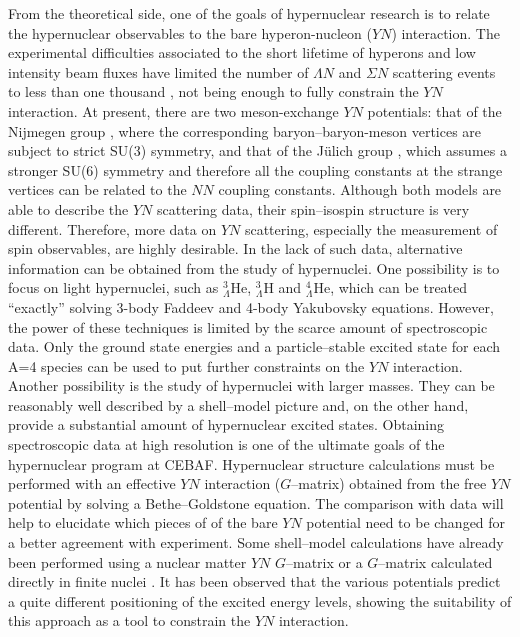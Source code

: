  From the theoretical side, one of the goals of hypernuclear research
is to relate the hypernuclear observables to the bare hyperon-nucleon
($YN$) interaction. The experimental
difficulties associated to the short lifetime of 
hyperons and low intensity beam fluxes have limited
the number of $\Lambda N$ and $\Sigma N$ scattering
events to less than one thousand \cite{scat1,scat2,scat3,scat4,scat5},
not being enough to fully constrain the $YN$ interaction. At
present, there are two meson-exchange
$YN$ potentials:
that of the Nijmegen group \cite{nijmegen}, where the corresponding
baryon--baryon-meson vertices are subject to strict SU(3) symmetry, and
that
of the J\"ulich group \cite{juelich}, which assumes a stronger SU(6)
symmetry and therefore all the coupling constants at the strange
vertices can be related to the $NN$ coupling constants. Although both
models are able to describe the $YN$ scattering data, their
spin--isospin structure is very different.
Therefore,
more data on $YN$ scattering, especially the measurement of spin
observables, are highly desirable.
In the lack of such data, alternative information can be obtained
from the study of hypernuclei.
One possibility is to
focus on light hypernuclei, such as $^3_{\Lambda}$He,
$^3_{\Lambda}$H and $^4_{\Lambda}$He, which can be treated
``exactly'' solving 3-body Faddeev \cite{gloeckle1,gloeckle2} and
4-body Yakubovsky \cite{gibson} equations. However, the power of
these techniques
is limited by the scarce amount of spectroscopic data.
Only the ground state energies and a
particle--stable excited
state for each A=4 species can be used to put further constraints on
the $YN$ interaction. Another possibility is the study of hypernuclei
with larger masses. They can
be reasonably well described by a shell--model picture and, on the
other hand, provide
a substantial amount of hypernuclear excited states.
Obtaining
spectroscopic data at high resolution is one of the ultimate goals of
the hypernuclear program at CEBAF.
Hypernuclear structure calculations must be performed with
an effective $YN$ interaction ($G$--matrix) obtained from the free
$YN$ potential by
solving a Bethe--Goldstone equation. The comparison with
data will help to elucidate which pieces of
of the bare $YN$ potential
need to be changed for a better agreement with experiment.
Some shell--model calculations have already been performed
using a nuclear matter
$YN$ $G$--matrix \cite{bando,yamamoto} or a $G$--matrix calculated
directly in finite nuclei \cite{kuo,halderson}. It
has been observed that the various potentials predict a quite
different positioning of the excited energy levels, showing the
suitability of this approach as a tool to constrain the $YN$
interaction.

